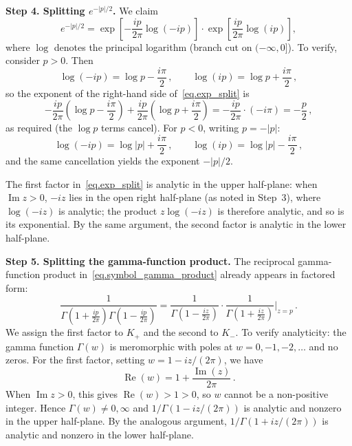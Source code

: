 \documentclass[11pt,a4paper]{article}
\theoremstyle{definition}
\begin{document}
\medskip
\noindent\textbf{Step 4.  Splitting $e^{-|p|/2}$.}
We claim
\begin{equation}\label{eq.exp_split}
  e^{-|p|/2}
  = \exp \left[-\frac{ip}{2\pi}\log(-ip)\right]
    \cdot\exp \left[\frac{ip}{2\pi}\log(ip)\right],
\end{equation}
where $\log$ denotes the principal logarithm (branch cut on
$(-\infty,0]$).  To verify, consider $p > 0$.  Then
\begin{equation}
  \log(-ip) = \log p - \frac{i\pi}{2}\,,\qquad
  \log(ip) = \log p + \frac{i\pi}{2}\,,
\end{equation}
so the exponent of the right-hand side of~\eqref{eq.exp_split} is
\begin{equation}
  -\frac{ip}{2\pi}\left(\log p - \frac{i\pi}{2}\right)
  + \frac{ip}{2\pi}\left(\log p + \frac{i\pi}{2}\right)
  = -\frac{ip}{2\pi}\cdot(-i\pi)
  = -\frac{p}{2}\,,
\end{equation}
as required (the $\log p$ terms cancel).  For $p < 0$, writing $p = -|p|$:
\begin{equation}
  \log(-ip) = \log|p| + \frac{i\pi}{2}\,,\qquad
  \log(ip) = \log|p| - \frac{i\pi}{2}\,,
\end{equation}
and the same cancellation yields the exponent $-|p|/2$.

The first factor in~\eqref{eq.exp_split} is analytic in the upper half-plane:
when $\operatorname{Im} z > 0$, $-iz$ lies in the open right half-plane (as
noted in Step~3), where $\log(-iz)$ is analytic; the product
$z\log(-iz)$ is therefore analytic, and so is its exponential.
By the same argument, the second factor is analytic in the lower
half-plane.

\medskip
\noindent\textbf{Step 5.  Splitting the gamma-function product.}
The reciprocal gamma-function product in~\eqref{eq.symbol_gamma_product}
already appears in factored form:
\begin{equation}\label{eq.gamma-split}
  \frac{1}{\Gamma \left(1 + \frac{ip}{2\pi}\right)
  \Gamma \left(1 - \frac{ip}{2\pi}\right)}
  = \frac{1}{\Gamma \left(1 - \frac{iz}{2\pi}\right)}
  \cdot \frac{1}{\Gamma \left(1 + \frac{iz}{2\pi}\right)}
  \Bigg|_{z=p}\,.
\end{equation}
We assign the first factor to $K_+$ and the second to $K_-$.  To verify
analyticity: the gamma function $\Gamma(w)$ is meromorphic with poles at
$w = 0, -1, -2, \ldots$ and no zeros.  For the first factor, setting
$w = 1 - iz/(2\pi)$, we have
\begin{equation}
  \operatorname{Re}(w) = 1 + \frac{\operatorname{Im}(z)}{2\pi}\,.
\end{equation}
When $\operatorname{Im} z > 0$, this gives $\operatorname{Re}(w) > 1 > 0$,
so $w$ cannot be a non-positive integer.  Hence $\Gamma(w) \neq 0, \infty$
and $1/\Gamma(1 - iz/(2\pi))$ is analytic and nonzero in the upper
half-plane.  By the analogous argument, $1/\Gamma(1 + iz/(2\pi))$ is analytic
and nonzero in the lower half-plane.
\end{document}

